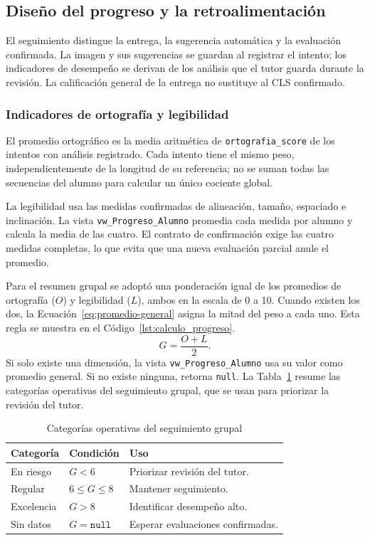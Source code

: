 \subsection{Diseño del progreso y la retroalimentación}

El seguimiento distingue la entrega, la sugerencia automática y la evaluación confirmada. La imagen y sus sugerencias se guardan al registrar el intento; los indicadores de desempeño se derivan de los análisis que el tutor guarda durante la revisión. La calificación general de la entrega no sustituye al CLS confirmado.

\subsubsection{Indicadores de ortografía y legibilidad}
El promedio ortográfico es la media aritmética de \texttt{ortografia\_score} de los intentos con análisis registrado. Cada intento tiene el mismo peso, independientemente de la longitud de su referencia; no se suman todas las secuencias del alumno para calcular un único cociente global.

La legibilidad usa las medidas confirmadas de alineación, tamaño, espaciado e inclinación. La vista \texttt{vw\_Progreso\_Alumno} promedia cada medida por alumno y calcula la media de las cuatro. El contrato de confirmación exige las cuatro medidas completas, lo que evita que una nueva evaluación parcial anule el promedio.

Para el resumen grupal se adoptó una ponderación igual de los promedios de ortografía ($O$) y legibilidad ($L$), ambos en la escala de 0 a 10. Cuando existen los dos, la Ecuación~\eqref{eq:promedio-general} asigna la mitad del peso a cada uno. Esta regla se muestra en el Código~\ref{lst:calculo_progreso}.
\begin{equation}
 G=\frac{O+L}{2}.
 \label{eq:promedio-general}
\end{equation}
Si solo existe una dimensión, la vista \texttt{vw\_Progreso\_Alumno} usa su valor como promedio general. Si no existe ninguna, retorna \texttt{null}. La Tabla~\ref{tab:categorias-progreso} resume las categorías operativas del seguimiento grupal, que se usan para priorizar la revisión del tutor.

\begin{table}[H]
\centering
\caption{Categorías operativas del seguimiento grupal}
\label{tab:categorias-progreso}
\begin{tabular}{lll}
\toprule Categoría & Condición & Uso \\ \midrule
En riesgo & $G<6$ & Priorizar revisión del tutor. \\
Regular & $6\leq G\leq 8$ & Mantener seguimiento. \\
Excelencia & $G>8$ & Identificar desempeño alto. \\
Sin datos & $G=\texttt{null}$ & Esperar evaluaciones confirmadas. \\
\bottomrule
\end{tabular}
\end{table}

